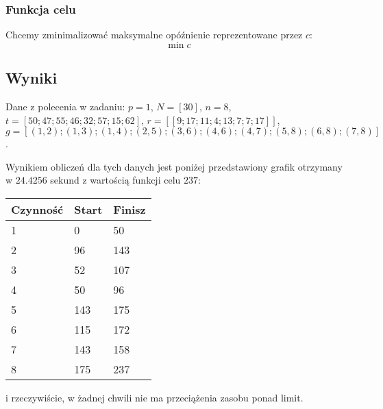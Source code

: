 \documentclass{article}
\theoremstyle{definition}
\theoremstyle{remark}
\theoremstyle{plain}
\theoremstyle{remark}
\theoremstyle{plain}
\begin{document}
\subsubsection{Funkcja celu}
Chcemy zminimalizować maksymalne opóźnienie reprezentowane przez $c$: 
\[ \min c \]

\subsection{Wyniki}
Dane z polecenia w zadaniu: $p=1$, $N=[30]$, $n=8$, $t=[50; 47; 55; 46; 32; 57; 15; 62]$, $r = [[9; 17; 11; 4; 13; 7; 7; 17]]$, $g = [(1,2);(1,3);(1,4);(2,5);(3,6);(4,6);(4,7);(5,8);(6,8);(7,8)]$.

Wynikiem obliczeń dla tych danych jest poniżej przedstawiony grafik otrzymany w $24.4256$ sekund z wartością funkcji celu $237$:

\begin{table}[H]
\centering
\begin{tabular}{|l|l|l|}
\hline
Czynność & Start & Finisz \\ \hline
1        & 0     & 50     \\ \hline
2        & 96    & 143    \\ \hline
3        & 52    & 107    \\ \hline
4        & 50    & 96     \\ \hline
5        & 143   & 175    \\ \hline
6        & 115   & 172    \\ \hline
7        & 143   & 158    \\ \hline
8        & 175   & 237    \\ \hline
\end{tabular}
\end{table}

i rzeczywiście, w żadnej chwili nie ma przeciążenia zasobu ponad limit.

\end{document}
